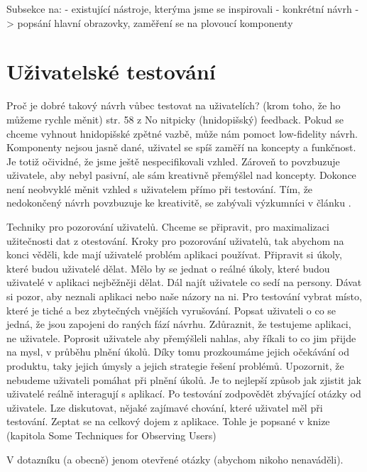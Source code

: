 Subsekce na:
- existující nástroje, kterýma jsme se inspirovali
- konkrétní návrh -> popsání hlavní obrazovky, zaměření se na plovoucí komponenty

\section{Uživatelské testování}


Proč je dobré takový návrh vůbec testovat na uživatelích? (krom toho, že ho můžeme rychle měnit) str. 58 z \cite{Paper_Prototyping} No nitpicky (hnidopišský) feedback. Pokud se chceme vyhnout hnidopišské zpětné vazbě, může nám pomoct low-fidelity návrh. Komponenty nejsou jasně dané, uživatel se spíš zaměří na koncepty a funkčnost. Je totiž očividné, že jsme ještě nespecifikovali vzhled. Zároveň to povzbuzuje uživatele, aby nebyl pasivní, ale sám kreativně přemýšlel nad koncepty. Dokonce není neobvyklé měnit vzhled s uživatelem přímo při testování. Tím, že nedokončený návrh povzbuzuje ke kreativitě, se zabývali výzkumníci v článku \cite{Schumann_1996_AEN}.

Techniky pro pozorování uživatelů. Chceme se připravit, pro maximalizaci užitečnosti dat z otestování. Kroky pro pozorování uživatelů, tak abychom na konci věděli, kde mají uživatelé problém aplikaci používat. 
Připravit si úkoly, které budou uživatelé dělat. Mělo by se jednat o reálné úkoly, které budou uživatelé v aplikaci nejběžněji dělat. 
Dál najít uživatele co sedí na persony. Dávat si pozor, aby neznali aplikaci nebo naše názory na ni.
Pro testování vybrat místo, které je tiché a bez zbytečných vnějších vyrušování.
Popsat uživateli o co se jedná, že jsou zapojeni do raných fází návrhu. Zdůraznit, že testujeme aplikaci, ne uživatele.
Poprosit uživatele aby přemýšleli nahlas, aby říkali to co jim přijde na mysl, v průběhu plnění úkolů. Díky tomu prozkoumáme jejich očekávání od produktu, taky jejich úmysly a jejich strategie řešení problémů.
Upozornit, že nebudeme uživateli pomáhat při plnění úkolů. Je to nejlepší způsob jak zjistit jak uživatelé reálně interagují s aplikací. 
Po testování zodpovědět zbývající otázky od uživatele. Lze diskutovat, nějaké zajímavé chování, které uživatel měl při testování. Zeptat se na celkový dojem z aplikace. Tohle je popsané v knize \cite{Brenda_1990_art} (kapitola Some Techniques for Observing Users)

V dotazníku (a obecně) jenom otevřené otázky (abychom nikoho nenaváděli).


